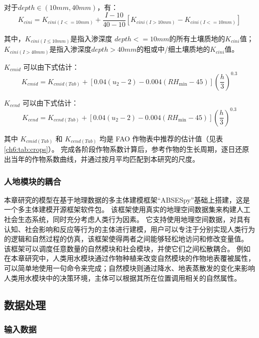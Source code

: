 对于$depth \in (10mm, 40mm)$，有：
\begin{equation}
    K_{c ini} = K_{c ini(I<=10mm)} + \frac{I-10}{40-10}[K_{c ini(I>10mm)} - K_{c ini(I<=10mm)}]
\end{equation}

其中，$K_{c ini(I≤10mm)}$是指入渗深度 $depth<=10 mm$的所有土壤质地的$K_{c ini}$值；$K_{c ini(I > 40 mm)}$是指入渗深度$depth>40 mm$的粗或中/细土壤质地的$K_{c ini}$值。

$K_{c mid}$ 可以由下式估计：
\begin{equation}
    K_{c mid} = K_{c mid(Tab)} + [0.04(u_2 - 2) -0.004(RH_{\min} - 45)]{(\frac{h}{3})}^{0.3}
\end{equation}

$K_{c end}$ 可以由下式估计：
\begin{equation}
    K_{c end} = K_{c end(Tab)} + [0.04(u_2 - 2) -0.004(RH_{\min} - 45)]{(\frac{h}{3})}^{0.3}
\end{equation}

其中 $K_{c mid(Tab)}$ 和 $K_{c end(Tab)}$ 均是 FAO 作物表中推荐的估计值（见表\ref{ch6:tab:crops}）。
完成各阶段作物系数计算后，参考作物的生长周期，逐日还原出当年的作物系数曲线，并通过按月平均匹配到本研究的尺度。

\subsubsection*{人地模块的耦合}

本章研究的模型在基于地理数据的多主体建模框架“ABSESpy”基础上搭建，这是一个多主体建模开源框架软件包。
该框架使用真实的地理空间数据集来构建人工社会生态系统，同时充分考虑人类行为因素。
它支持使用地理空间数据，对具有认知、社会影响和反应等行为的主体进行建模，用户可以专注于分别实现人类行为的逻辑和自然过程的仿真，该框架使得两者之间能够轻松地访问和修改变量值。
该框架可以调度任意数量的自然模块和社会模块，并使它们之间松散耦合。
例如在本章研究中，人类用水模块通过作物种植来改变自然模块的作物地表覆被属性，可以简单地使用一句命令来完成；自然模块则通过降水、地表蒸散发的变化来影响人类用水模块中的决策环境，主体可以根据其所在位置调用相关的自然属性。

\subsection{数据处理}

\subsubsection*{输入数据}

